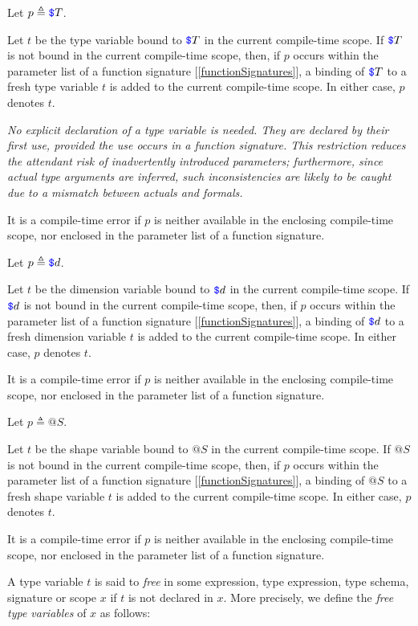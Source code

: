 \documentclass{article}
\begin{document}
{ \TYPEPARAM{}
 \SHAPEPARAM{}
 \DIMPARAM{}
 
 Let $p \triangleq \texttt{\color{blue} \$}{}T$.
 
 Let $t$ be the type variable bound to $\texttt{\color{blue} \$}{}T$ in the current compile-time scope. If $\texttt{\color{blue} \$}{}T$ is not bound in the current compile-time scope, then, if $p$ occurs within  the parameter list of a function signature [\ref{functionSignatures}],  a binding of $\texttt{\color{blue} \$}{}T$ to a fresh type variable $t$ is added to the current compile-time scope. In either case, $p$ denotes  $t$. 
 
 {\em 
No explicit declaration of a type variable is needed. They are declared by their first use, provided the use occurs in a function signature. This restriction reduces the attendant risk of inadvertently introduced parameters; furthermore, since
 actual type arguments are inferred, such inconsistencies are likely to be caught due to a mismatch between actuals and formals.
 } 
 
 It is a compile-time error if $p$ is neither available in the enclosing compile-time scope, nor enclosed in the parameter list of a function signature.
 
 Let $p \triangleq \texttt{\color{blue} \$}{}d$.
 
 Let $t$ be the dimension variable bound to $\texttt{\color{blue} \$}{}d$ in the current compile-time scope. If $\texttt{\color{blue} \$}{}d$ is not bound in the current compile-time scope, then, if $p$ occurs within the parameter list of a function signature [\ref{functionSignatures}],  a binding of $\texttt{\color{blue} \$}{}d$ to a fresh dimension variable $t$ is added to the current compile-time scope. In either case, $p$ denotes  $t$. 

 
 It is a compile-time error if $p$ is neither available in the enclosing compile-time scope, nor enclosed in the parameter list of a function signature.
 
 Let $p \triangleq @{}S$.
 
 Let $t$ be the shape variable bound to  $@{}S$ in the current compile-time scope. If $@{}S$ is not bound in the current compile-time scope, then, if $p$ occurs within the parameter list of a function signature [\ref{functionSignatures}],  a binding of  $@{}S$ to a fresh shape variable $t$ is added to the current compile-time scope. In either case, $p$ denotes  $t$. 
 
 It is a compile-time error if $p$ is neither available in the enclosing compile-time scope, nor enclosed in the parameter list of a function signature.
 
 A type variable $t$ is said to {\em free} in some expression, type expression, type schema, signature or scope $x$ if $t$ is not declared in $x$.  More precisely, we define the {\em free type variables} of $x$ as follows:
 
}
\end{document}
